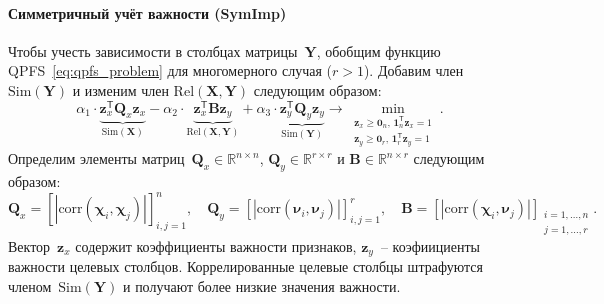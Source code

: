 \documentclass[preprint,12pt]{elsarticle}
\theoremstyle{definition}
\newcommand{\bz}{\mathbf{z}}
\newcommand{\bY}{\mathbf{Y}}
\newcommand{\bX}{\mathbf{X}}
\newcommand{\bB}{\mathbf{B}}
\newcommand{\bQ}{\mathbf{Q}}
\newcommand{\bbR}{\mathbb{R}}
\newcommand{\T}{\mathsf{T}}
\newcommand{\bchi}{\boldsymbol{\chi}}
\newcommand{\bnu}{\boldsymbol{\nu}}
\newcommand{\bOne}{\boldsymbol{1}}
\newcommand{\bZero}{\boldsymbol{0}}
\begin{document}
\paragraph{Симметричный учёт важности (SymImp)}
Чтобы учесть зависимости в столбцах матрицы~$\bY$, обобщим функцию QPFS~\eqref{eq:qpfs_problem} для многомерного случая ($r > 1$).
Добавим член~$\text{Sim}(\bY)$ и изменим член $\text{Rel}(\bX, \bY)$ следующим образом:
\begin{equation}
\alpha_1 \cdot \underbrace{\bz_x^{\T} \bQ_x \bz_x}_{\text{Sim}(\bX)} - \alpha_2 \cdot \underbrace{\bz_x^{\T} \bB \bz_y}_{\text{Rel}(\bX, \bY)} + \alpha_3 \cdot \underbrace{\bz_y^{\T} \bQ_y \bz_y}_{\text{Sim}(\bY)} \rightarrow \min_{\substack{\bz_x \geq \bZero_n, \, \bOne_n^{\T}\bz_x=1 \\ \bz_y \geq \bZero_r, \, \bOne_r^{\T}\bz_y=1}}.
\label{eq:symimp}
\end{equation}
Определим элементы матриц~$\bQ_x \in \bbR^{n \times n}$, $\bQ_y \in \bbR^{r \times r}$ и $\bB \in \bbR^{n \times r}$ следующим образом:
\begin{equation*}
\bQ_x = \left[ |\text{corr}(\bchi_i, \bchi_j)| \right]_{i,j=1}^n, \quad
\bQ_y = \left[ |\text{corr}(\bnu_i, \bnu_j)| \right]_{i,j=1}^r, \quad
\bB =  \left[ |\text{corr}(\bchi_i, \bnu_j)| \right]_{\substack{i=1, \dots, n \\ j=1, \dots, r}}.
\end{equation*}
Вектор~$\bz_x$ содержит коэффициенты важности признаков, $\bz_y$~-- коэфиициенты важности целевых столбцов.
Коррелированные целевые столбцы штрафуются членом~$\text{Sim}(\bY)$ и получают более низкие значения важности.
\end{document}
